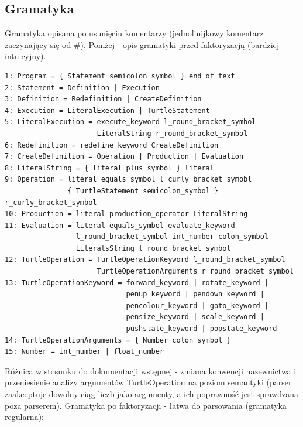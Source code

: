 \documentclass{article}
\begin{document}
\subsection{Gramatyka}
Gramatyka opisana po usunięciu komentarzy (jednolinijkowy komentarz zaczynający się od \#). Poniżej - opis gramatyki przed faktoryzacją (bardziej intuicyjny).
\begin{lstlisting}
1: Program = { Statement semicolon_symbol } end_of_text
2: Statement = Definition | Execution
3: Definition = Redefinition | CreateDefinition
4: Execution = LiteralExecution | TurtleStatement
5: LiteralExecution = execute_keyword l_round_bracket_symbol 
                      LiteralString r_round_bracket_symbol
6: Redefinition = redefine_keyword CreateDefinition
7: CreateDefinition = Operation | Production | Evaluation
8: LiteralString = { literal plus_symbol } literal
9: Operation = literal equals_symbol l_curly_bracket_symobl
               { TurtleStatement semicolon_symbol } r_curly_bracket_symbol
10: Production = literal production_operator LiteralString
11: Evaluation = literal equals_symbol evaluate_keyword
                 l_round_bracket_symbol int_number colon_symbol
                 LiteralsString l_round_bracket_symbol
12: TurtleOperation = TurtleOperationKeyword l_round_bracket_symbol
                      TurtleOperationArguments r_round_bracket_symbol
13: TurtleOperationKeyword = forward_keyword | rotate_keyword |
                             penup_keyword | pendown_keyword |
                             pencolour_keyword | goto_keyword |
                             pensize_keyword | scale_keyword |
                             pushstate_keyword | popstate_keyword
14: TurtleOperationArguments = { Number colon_symbol }
15: Number = int_number | float_number
\end{lstlisting}
Różnica w stosunku do dokumentacji wstępnej - zmiana konwencji nazewnictwa i przeniesienie analizy argumentów TurtleOperation na poziom semantyki (parser zaakceptuje dowolny ciąg liczb jako argumenty, a ich poprawność jest sprawdzana poza parserem).
\newline{} \newline{}
Gramatyka po faktoryzacji - łatwa do parsowania (gramatyka regularna):
\end{document}
